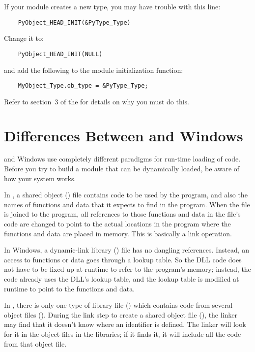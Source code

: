 If your module creates a new type, you may have trouble with this line:

\begin{verbatim}
    PyObject_HEAD_INIT(&PyType_Type)
\end{verbatim}

Change it to:

\begin{verbatim}
    PyObject_HEAD_INIT(NULL)
\end{verbatim}

and add the following to the module initialization function:

\begin{verbatim}
    MyObject_Type.ob_type = &PyType_Type;
\end{verbatim}

Refer to section~3 of the
 for details
on why you must do this.


\section{Differences Between \UNIX{} and Windows
     \label{dynamic-linking}}


\UNIX{} and Windows use completely different paradigms for run-time
loading of code.  Before you try to build a module that can be
dynamically loaded, be aware of how your system works.

In \UNIX, a shared object () file contains code to be used by the
program, and also the names of functions and data that it expects to
find in the program.  When the file is joined to the program, all
references to those functions and data in the file's code are changed
to point to the actual locations in the program where the functions
and data are placed in memory.  This is basically a link operation.

In Windows, a dynamic-link library () file has no dangling
references.  Instead, an access to functions or data goes through a
lookup table.  So the DLL code does not have to be fixed up at runtime
to refer to the program's memory; instead, the code already uses the
DLL's lookup table, and the lookup table is modified at runtime to
point to the functions and data.

In \UNIX, there is only one type of library file () which
contains code from several object files ().  During the link
step to create a shared object file (), the linker may find
that it doesn't know where an identifier is defined.  The linker will
look for it in the object files in the libraries; if it finds it, it
will include all the code from that object file.


